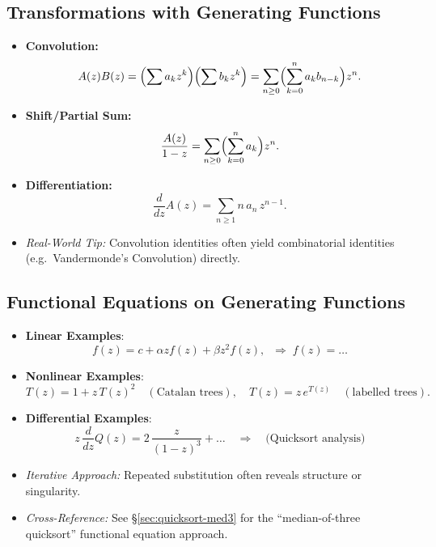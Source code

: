 \documentclass[11pt,letterpaper]{article}
\begin{document}
\subsection{Transformations with Generating Functions}
\label{sec:conv-diff}
\begin{itemize}
  \item \textbf{Convolution:} 
    \[
      A(z)B(z)=\Bigl(\sum a_k z^k\Bigr)\Bigl(\sum b_k z^k\Bigr)
      =\sum_{n\ge0}\Bigl(\sum_{k=0}^n a_k b_{n-k}\Bigr) z^n.
    \]
  \item \textbf{Shift/Partial Sum:}
    \[
      \frac{A(z)}{1-z} = \sum_{n\ge0} \Bigl(\sum_{k=0}^n a_k\Bigr)z^n.
    \]
  \item \textbf{Differentiation:} 
    \[
      \frac{d}{dz}A(z) = \sum_{n\ge1} n\,a_n\,z^{n-1}.
    \]
  \item \emph{Real-World Tip:} Convolution identities often yield combinatorial identities (e.g.\ Vandermonde’s Convolution) directly.
\end{itemize}

\subsection{Functional Equations on Generating Functions}
\begin{itemize}
  \item \textbf{Linear Examples}: 
    \[
      f(z)=c + \alpha z f(z) + \beta z^2 f(z),\;\;
      \Longrightarrow\; f(z) = \dots
    \]
  \item \textbf{Nonlinear Examples}: 
    \[
      T(z)=1+z\,T(z)^2 \quad(\text{Catalan trees}),\quad 
      T(z)=z\,e^{T(z)} \quad(\text{labelled trees}).
    \]
  \item \textbf{Differential Examples}:
    \[
      z\,\frac{d}{dz}Q(z)=2\,\frac{z}{(1-z)^3}+ \dots 
      \quad\Longrightarrow\quad \text{(Quicksort analysis)}
    \]
  \item \emph{Iterative Approach:} Repeated substitution often reveals structure or singularity. 
  \item \emph{Cross-Reference:} See \S\ref{sec:quicksort-med3} for the “median-of-three quicksort” functional equation approach.
\end{itemize}

\end{document}
